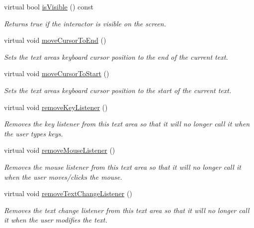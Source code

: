 \begin{DoxyCompactItemize}
virtual bool \mbox{\hyperlink{classGInteractor_a9d8a6cfb13917785c143e74d40e4e2be}{is\+Visible}} () const
\begin{DoxyCompactList}\small\item\em Returns true if the interactor is visible on the screen. \end{DoxyCompactList}\item 
virtual void \mbox{\hyperlink{classGTextArea_ab5ef729cac166db0ef51ff7ea30d1bb8}{move\+Cursor\+To\+End}} ()
\begin{DoxyCompactList}\small\item\em Sets the text area\textquotesingle{}s keyboard cursor position to the end of the current text. \end{DoxyCompactList}\item 
virtual void \mbox{\hyperlink{classGTextArea_a24abdceab57bcff96185afbadf193a22}{move\+Cursor\+To\+Start}} ()
\begin{DoxyCompactList}\small\item\em Sets the text area\textquotesingle{}s keyboard cursor position to the start of the current text. \end{DoxyCompactList}\item 
virtual void \mbox{\hyperlink{classGTextArea_a43095f41cab3be732b49f29970484b05}{remove\+Key\+Listener}} ()
\begin{DoxyCompactList}\small\item\em Removes the key listener from this text area so that it will no longer call it when the user types keys. \end{DoxyCompactList}\item 
virtual void \mbox{\hyperlink{classGTextArea_aff47f71ce47e688a07c9d38dc92fcc11}{remove\+Mouse\+Listener}} ()
\begin{DoxyCompactList}\small\item\em Removes the mouse listener from this text area so that it will no longer call it when the user moves/clicks the mouse. \end{DoxyCompactList}\item 
virtual void \mbox{\hyperlink{classGTextArea_a69c940b99d01eb7c353763ce4b0942a4}{remove\+Text\+Change\+Listener}} ()
\begin{DoxyCompactList}\small\item\em Removes the text change listener from this text area so that it will no longer call it when the user modifies the text. \end{DoxyCompactList}\item 

\end{DoxyCompactItemize}
